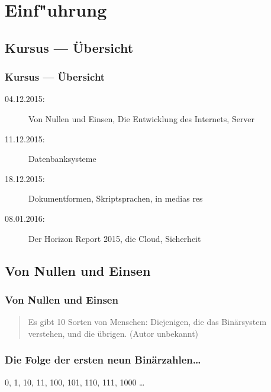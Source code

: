 \section{Einf"uhrung}
  \subsection<beamer>{Kursus --- Übersicht}
  \begin{frame}
    \frametitle<beamer>{Kursus --- Übersicht}
    \begin{description}
      \item[04.12.2015: ]Von Nullen und Einsen, Die Entwicklung des Internets, Server
      \item[11.12.2015: ]Datenbanksysteme
      \item[18.12.2015: ]Dokumentformen, Skriptsprachen, in medias res
      \item[08.01.2016: ]Der Horizon Report 2015, die Cloud, Sicherheit
    \end{description}
  \end{frame}

  \subsection{Von Nullen und Einsen}
  \begin{frame}
    \frametitle<beamer>{Von Nullen und Einsen}
      \begin{quote}
        Es gibt 10 Sorten von Menschen: Diejenigen, die das Binärsystem verstehen, und die übrigen. \hfill (Autor unbekannt)
      \end{quote}
  \end{frame}


  \begin{frame}
  \frametitle{Die Folge der ersten neun Binärzahlen\ldots}
    \begin{center}
      0, 1, 10, 11, 100, 101, 110, 111, 1000 \ldots
    \end{center}
  \end{frame}

